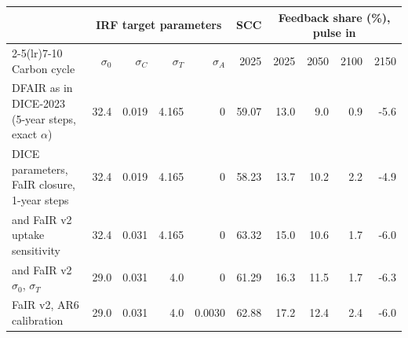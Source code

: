 \begin{tabular}{lrrrrrrrrr}
\toprule
 & \multicolumn{4}{c}{IRF target parameters} & SCC & \multicolumn{4}{c}{Feedback share (\%), pulse in} \\
\cmidrule(lr){2-5}\cmidrule(lr){7-10}
Carbon cycle & $\sigma_0$ & $\sigma_C$ & $\sigma_T$ & $\sigma_A$ & 2025 & 2025 & 2050 & 2100 & 2150 \\
\midrule
DFAIR as in DICE-2023 (5-year steps, exact $\alpha$) & 32.4 & 0.019 & 4.165 & 0 & 59.07 & 13.0 & 9.0 & 0.9 & -5.6 \\
DICE parameters, FaIR closure, 1-year steps & 32.4 & 0.019 & 4.165 & 0 & 58.23 & 13.7 & 10.2 & 2.2 & -4.9 \\
\quad and FaIR v2 uptake sensitivity & 32.4 & 0.031 & 4.165 & 0 & 63.32 & 15.0 & 10.6 & 1.7 & -6.0 \\
\quad and FaIR v2 $\sigma_0$, $\sigma_T$ & 29.0 & 0.031 & 4.0 & 0 & 61.29 & 16.3 & 11.5 & 1.7 & -6.3 \\
FaIR v2, AR6 calibration & 29.0 & 0.031 & 4.0 & 0.0030 & 62.88 & 17.2 & 12.4 & 2.4 & -6.0 \\
\bottomrule
\end{tabular}
